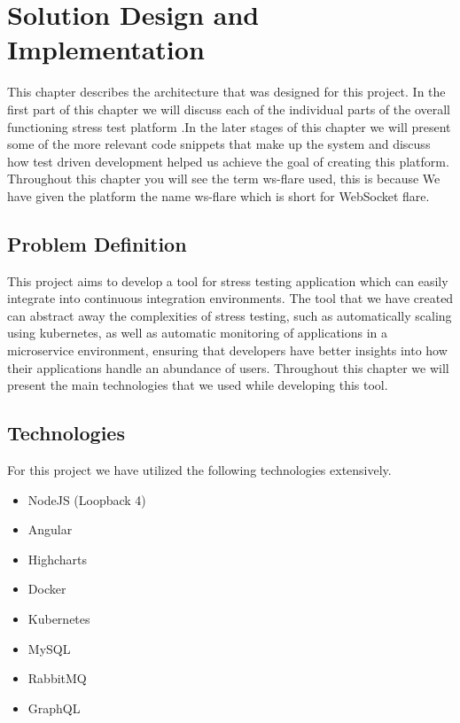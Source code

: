 \chapter{Solution Design and Implementation}

This chapter describes the architecture that was designed for this project. In the first part of this chapter we will discuss each of the individual parts of the overall functioning stress test platform .In the later stages of this chapter we will present some of the more relevant code snippets that make up the system and discuss how test driven development helped us achieve the goal of creating this platform. Throughout this chapter you will see the term ws-flare used, this is because We have given the platform the name ws-flare which is short for WebSocket flare.

\section{Problem Definition}

This project aims to develop a tool for stress testing application which can easily integrate into continuous integration environments. The tool that we have created can abstract away the complexities of stress testing, such as automatically scaling using kubernetes, as well as automatic monitoring of applications in a microservice environment, ensuring that developers have better insights into how their applications handle an abundance of users. Throughout this chapter we will present the main technologies that we used while developing this tool.

\section{Technologies}

For this project we have utilized the following technologies extensively.

\begin{itemize}
  \item NodeJS (Loopback 4)
  \item Angular
  \item Highcharts
  \item Docker
  \item Kubernetes
  \item MySQL
  \item RabbitMQ
  \item GraphQL
\end{itemize}

